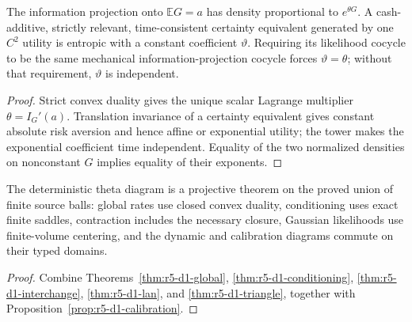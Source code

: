 \begin{proposition}
\label{prop:r5-d1-calibration}
The information projection onto \(\mathbb E G=a\) has density proportional to
\(e^{\theta G}\).  A cash-additive, strictly relevant, time-consistent
certainty equivalent generated by one \(C^2\) utility is entropic with a
constant coefficient \(\vartheta\).  Requiring its likelihood cocycle to be
the same mechanical information-projection cocycle forces
\(\vartheta=\theta\); without that requirement, \(\vartheta\) is independent.
\end{proposition}

\begin{proof}
Strict convex duality gives the unique scalar Lagrange multiplier
\(\theta=I_G'(a)\).  Translation invariance of a certainty equivalent gives
constant absolute risk aversion and hence affine or exponential utility; the
tower makes the exponential coefficient time independent.  Equality of the
two normalized densities on nonconstant \(G\) implies equality of their
exponents.
\end{proof}

\begin{theorem}
\label{thm:r5-d1-main}
The deterministic theta diagram is a projective theorem on the proved union
of finite source balls: global rates use closed convex duality, conditioning
uses exact finite saddles, contraction includes the necessary closure,
Gaussian likelihoods use finite-volume centering, and the dynamic and
calibration diagrams commute on their typed domains.
\end{theorem}

\begin{proof}
Combine Theorems~\ref{thm:r5-d1-global},
\ref{thm:r5-d1-conditioning}, \ref{thm:r5-d1-interchange},
\ref{thm:r5-d1-lan}, and \ref{thm:r5-d1-triangle}, together with
Proposition~\ref{prop:r5-d1-calibration}.
\end{proof}
